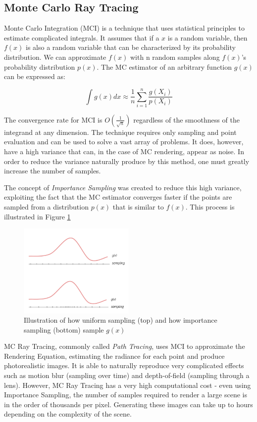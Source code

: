 \subsection{Monte Carlo Ray Tracing}

Monte Carlo Integration (MCI) is a technique that uses statistical principles to estimate complicated integrals. It assumes that if a $x$ is a random variable, then $f(x)$ is also a random variable that can be characterized by its probability distribution. We can approximate $f(x)$ with n random samples along $f(x)$'s probability distribution $p(x)$. The MC estimator of an arbitrary function $g(x)$ can be expressed as:

$$ \int g(x)dx \approx \frac{1}{n} \sum_{i = 1}^{n} \frac{g(X_i)}{p(X_i)}$$

The convergence rate for MCI is $O(\frac{1}{\sqrt{n}})$ regardless of the smoothness of the integrand at any dimension. The technique requires only sampling and point evaluation and can be used to solve a vast array of problems. It does, however, have a high variance that can, in the case of MC rendering, appear as noise. In order to reduce the variance naturally produce by this method, one must greatly increase the number of samples.

The concept of \textit{Importance Sampling} was created to reduce this high variance, exploiting the fact that the MC estimator converges faster if the points are sampled from a distribution $p(x)$ that is similar to $f(x)$. This process is illustrated in Figure \ref{fig:importance}

\begin{figure}[h]
  \centering
  \includegraphics[width=0.5\textwidth,height=\textheight,keepaspectratio]{images/3_theoretical_foundations/importances.png}
  \caption{Illustration of how uniform sampling (top) and how importance sampling (bottom) sample $g(x)$}
  \label{fig:importance}
\end{figure}

MC Ray Tracing, commonly called \textit{Path Tracing}, uses MCI to approximate the Rendering Equation, estimating the radiance for each point and produce photorealistic images. It is able to naturally reproduce very complicated effects such as motion blur (sampling over time) and depth-of-field (sampling through a lens). However, MC Ray Tracing has a very high computational cost - even using Importance Sampling, the number of samples required to render a large scene is in the order of thousands per pixel. Generating these images can take up to hours depending on the complexity of the scene. 


